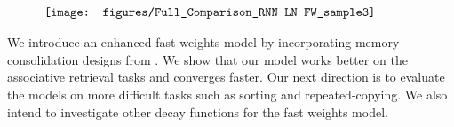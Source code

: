 \documentclass[portrait,a0b,final,a4resizeable]{include/a0poster}
\begin{document}
\begin{poster}
\begin{multicols}{3}
\vspace{-1.25in}
\begin{align*}
\hspace{-0.475in}
\texttt{[image: figures/Full\_Comparison\_RNN-LN-FW\_sample3]}
\end{align*}


\vspace{1.cm}
We introduce an enhanced fast weights model by incorporating memory consolidation designs from \cite{pld}.
We show that our model works better on the associative retrieval tasks and converges faster.
Our next direction is to evaluate the models on more difficult tasks such as sorting and repeated-copying.
We also intend to investigate other decay functions for the fast weights model.

\vspace{1.cm}

\small
\begingroup
\renewcommand{\section}[2]{}%

\endgroup


 
\end{multicols}
\end{poster}
\end{document}
